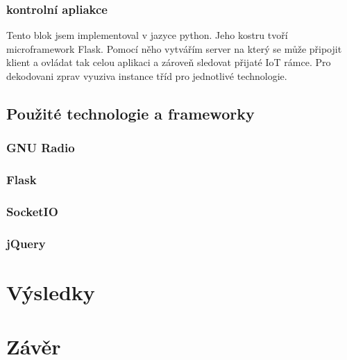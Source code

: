 \documentclass{ctuthesis}
\begin{document}
\subsection{kontrolní apliakce}
Tento blok jsem implementoval v jazyce python. Jeho kostru tvoří microframework Flask. Pomocí něho vytvářím server na který se může připojit klient a ovládat tak celou aplikaci a zároveň sledovat přijaté IoT rámce. Pro dekodovani zprav vyuziva instance tříd  pro jednotlivé technologie.




\section{Použité technologie a frameworky}
\subsection{GNU Radio}
\subsection{Flask}
\subsection{SocketIO}
\subsection{jQuery}


\chapter{Výsledky}
\chapter{Závěr}





\end{document}
